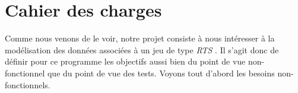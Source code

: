 \chapter{Cahier des charges}
\minitoc

Comme nous venons de le voir, notre projet consiste à nous intéresser à la modélisation des données associées à un jeu de type \emph{RTS} . Il s'agit donc de définir pour ce programme les objectifs aussi bien du point de vue non-fonctionnel que du point de vue des tests. Voyons tout d'abord les besoins non-fonctionnels.



